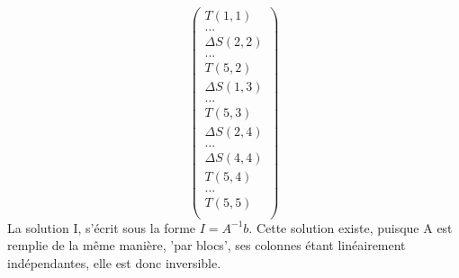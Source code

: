 \begin{equation}
\begin{pmatrix}
T(1,1)\\
...\\
\Delta S(2,2)\\
...\\
T(5,2)\\
\Delta S(1,3)\\
...\\
T(5,3)\\
\Delta S(2,4)\\
...\\
\Delta S(4,4)\\
T(5,4)\\
...\\
T(5,5)\\
\end{pmatrix}
\end{equation}
La solution I, s'écrit sous la forme $I = A^{-1}b$.
Cette solution existe, puisque A est remplie de la même manière, 'par blocs', ses colonnes étant linéairement indépendantes, elle est donc inversible.

